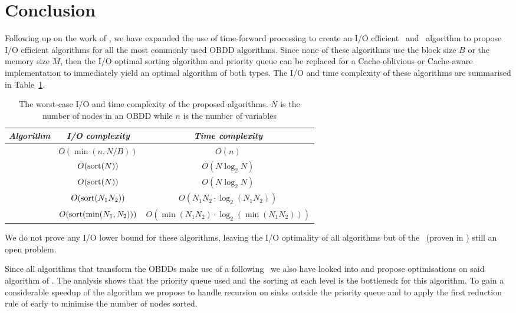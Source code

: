 \section{Conclusion} \label{sec:conclusion}
Following up on the work of \cite{Arge96}, we have expanded the use of
time-forward processing to create an I/O efficient \Reduce\ and \Apply\
algorithm to propose I/O efficient algorithms for all the most commonly used
OBDD algorithms. Since none of these algorithms use the block size $B$ or the
memory size $M$, then the I/O optimal sorting algorithm and priority queue can
be replaced for a Cache-oblivious or Cache-aware implementation to immediately
yield an optimal algorithm of both types. The I/O and time complexity of these
algorithms are summarised in Table~\ref{tab:summary_efficiency}.

\begin{table}[ht!]
  \centering
  \begin{tabular}{c | c | c}
    \emph{Algorithm} & \emph{I/O complexity} & \emph{Time complexity}
    \\ \hline
    \Evaluate & $O(\min(n, N/B))$ & $O(n)$
    \\
    \Reduce & $O(\text{sort}(N))$ & $O(N \log_2 N)$
    \\
    \Restrict & $O(\text{sort}(N))$ & $O(N \log_2 N)$
    \\
    \Apply & $O(\text{sort}(N_1 N_2))$ & $O(N_1 N_2 \cdot \log_2 (N_1 N_2))$
    \\
    \Equal & $O(\text{sort}(\min(N_1, N_2)))$ & $O(\min(N_1 N_2) \cdot \log_2 (\min(N_1 N_2)))$
    \\
  \end{tabular}
  \caption{The worst-case I/O and time complexity of the proposed algorithms.
    $N$ is the number of nodes in an OBDD while $n$ is the number of variables}
  \label{tab:summary_efficiency}
\end{table}

We do not prove any I/O lower bound for these algorithms, leaving the
I/O optimality of all algorithms but of the \Reduce\ (proven in \cite{Arge96})
still an open problem.

Since all algorithms that transform the OBDDs make use of a following \Reduce\
we also have looked into and propose optimisations on said algorithm of
\cite{Arge96}. The analysis shows that the priority queue used and the sorting
at each level is the bottleneck for this algorithm. To gain a considerable
speedup of the algorithm we propose to handle recursion on sinks outside the
priority queue and to apply the first reduction rule of \cite{Bryant86} early to
minimise the number of nodes sorted.


